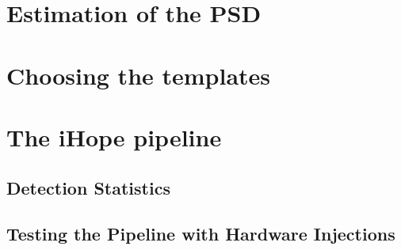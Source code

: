 \section{Estimation of the PSD}
\label{sec:ihope_psd}

\section{Choosing the templates}
\label{sec:bank_metric}

\section{The iHope pipeline}


\subsection{Detection Statistics}
\label{sec:detection_statistics}

\subsection{Testing the Pipeline with Hardware Injections}
\label{ssec:ihope_hardware_injections}


